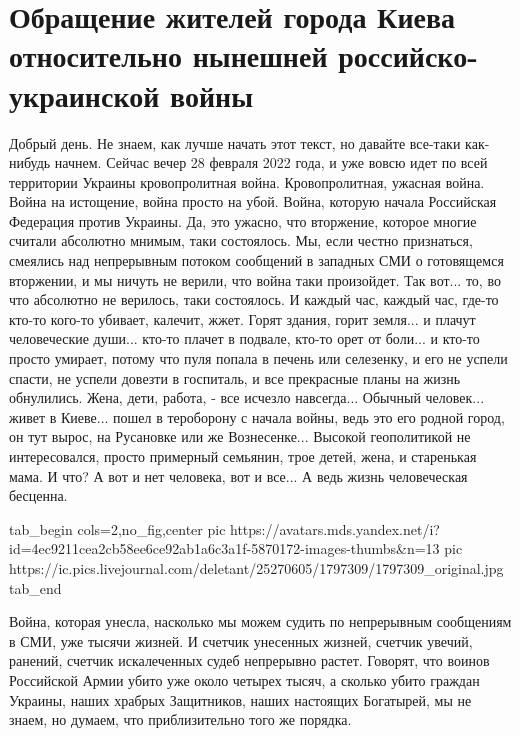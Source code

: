  
 
 
 
 

\section{Обращение жителей города Киева относительно нынешней российско-украинской войны}

Добрый день. Не знаем, как лучше начать этот текст, но давайте все-таки
как-нибудь начнем. Сейчас вечер 28 февраля 2022 года, и уже вовсю идет по всей
территории Украины кровопролитная война. Кровопролитная, ужасная война. Война
на истощение, война просто на убой. Война, которую начала Российская Федерация
против Украины. Да, это ужасно, что вторжение, которое многие считали абсолютно
мнимым, таки состоялось. Мы, если честно признаться, смеялись над непрерывным
потоком сообщений в западных СМИ о готовящемся вторжении, и мы ничуть не
верили, что война таки произойдет. Так вот... то, во что абсолютно не верилось,
таки состоялось. И каждый час, каждый час, где-то кто-то кого-то убивает,
калечит, жжет. Горят здания, горит земля... и плачут человеческие души...
кто-то плачет в подвале, кто-то орет от боли... и кто-то просто умирает, потому
что пуля попала в печень или селезенку, и его не успели спасти, не успели
довезти в госпиталь, и все прекрасные планы на жизнь обнулились. Жена, дети,
работа, - все исчезло навсегда... Обычный человек... живет в Киеве... пошел в
тероборону с начала войны, ведь это его родной город, он тут вырос, на
Русановке или же Вознесенке... Высокой геополитикой не интересовался, просто
примерный семьянин, трое детей, жена, и старенькая мама. И что? А вот и нет
человека, вот и все...  А ведь жизнь человеческая бесценна.

\ifcmt
  tab_begin cols=2,no_fig,center
     pic https://avatars.mds.yandex.net/i?id=4ec9211cea2cb58ee6ce92ab1a6c3a1f-5870172-images-thumbs&n=13
		 pic https://ic.pics.livejournal.com/deletant/25270605/1797309/1797309_original.jpg
  tab_end
\fi

Война, которая унесла, насколько мы можем судить по непрерывным сообщениям в
СМИ, уже тысячи жизней. И счетчик унесенных жизней, счетчик увечий, ранений,
счетчик искалеченных судеб непрерывно растет.  Говорят, что воинов Российской
Армии убито уже около четырех тысяч, а сколько убито граждан Украины, наших
храбрых Защитников, наших настоящих Богатырей, мы не знаем, но думаем, что
приблизительно того же порядка.

